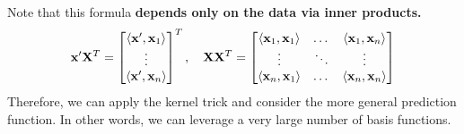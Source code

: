 Note that this formula \textbf{depends only on the data via inner products.}
\begin{align*}
	{\mathbf{x}}'\mathbf{X}^T = 
	\begin{bmatrix}
		\langle {\mathbf{x}}',{\mathbf{x}}_1\rangle\\
		\vdots\\
		\langle {\mathbf{x}}',{\mathbf{x}}_n\rangle
	\end{bmatrix}^T,\quad
	\mathbf{X}\mathbf{X}^T = 
	\begin{bmatrix}
		\langle {\mathbf{x}}_1,{\mathbf{x}}_1\rangle& \dots& \langle {\mathbf{x}}_1,{\mathbf{x}}_n\rangle\\
		\vdots&\ddots&\vdots\\
		\langle {\mathbf{x}}_n,{\mathbf{x}}_1\rangle &\dots &\langle {\mathbf{x}}_n,{\mathbf{x}}_n\rangle
	\end{bmatrix}
\end{align*}
Therefore, we can apply the kernel trick and consider the more general prediction function. In other words, we can leverage a very large number of basis functions. 






